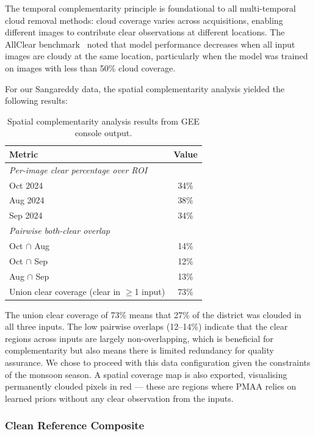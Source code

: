 \documentclass[12pt,a4paper]{article}
\begin{document}
The temporal complementarity principle is foundational to all multi-temporal cloud removal methods: cloud coverage varies across acquisitions, enabling different images to contribute clear observations at different locations. The AllClear benchmark~\cite{zhao2024allclear} noted that model performance decreases when all input images are cloudy at the same location, particularly when the model was trained on images with less than 50\% cloud coverage.

For our Sangareddy data, the spatial complementarity analysis yielded the following results:

\begin{table}[H]
\centering
\caption{Spatial complementarity analysis results from GEE console output.}
\label{tab:complementarity}
\begin{tabular}{lc}
\toprule
\textbf{Metric} & \textbf{Value} \\
\midrule
\multicolumn{2}{l}{\textit{Per-image clear percentage over ROI}} \\
\quad Oct 2024 & 34\% \\
\quad Aug 2024 & 38\% \\
\quad Sep 2024 & 34\% \\
\midrule
\multicolumn{2}{l}{\textit{Pairwise both-clear overlap}} \\
\quad Oct $\cap$ Aug & 14\% \\
\quad Oct $\cap$ Sep & 12\% \\
\quad Aug $\cap$ Sep & 13\% \\
\midrule
Union clear coverage (clear in $\geq$1 input) & 73\% \\
\bottomrule
\end{tabular}
\end{table}

The union clear coverage of 73\% means that 27\% of the district was clouded in all three inputs. The low pairwise overlaps (12--14\%) indicate that the clear regions across inputs are largely non-overlapping, which is beneficial for complementarity but also means there is limited redundancy for quality assurance. We chose to proceed with this data configuration given the constraints of the monsoon season. A spatial coverage map is also exported, visualising permanently clouded pixels in red --- these are regions where PMAA relies on learned priors without any clear observation from the inputs.

\subsubsection{Clean Reference Composite}
\end{document}
